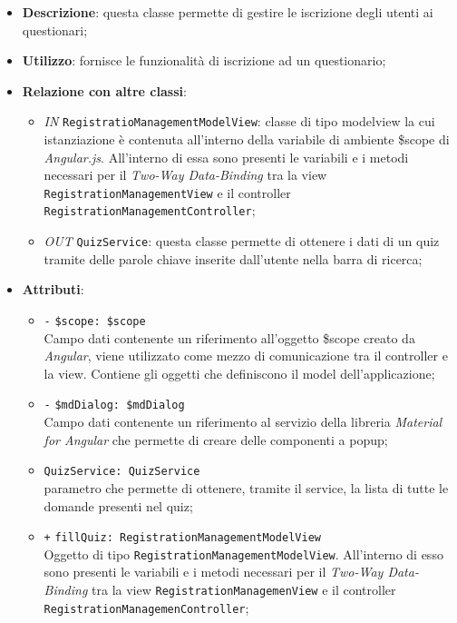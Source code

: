 \begin{itemize}
	\item \textbf{Descrizione}: questa classe permette di gestire le iscrizione degli utenti ai questionari;
	\item \textbf{Utilizzo}: fornisce le funzionalità di iscrizione ad un questionario;
	\item \textbf{Relazione con altre classi}:
	\begin{itemize}
		\item \textit{IN} \texttt{RegistratioManagementModelView}: classe di tipo modelview la cui istanziazione è contenuta all'interno della variabile di ambiente \$scope di \textit{Angular.js}. All'interno di essa sono presenti le variabili e i metodi necessari per il \textit{Two-Way Data-Binding} tra la view \texttt{RegistrationManagementView} e il controller \texttt{RegistrationManagementController}; 
		\item \textit{OUT} \texttt{QuizService}: questa classe permette di ottenere i dati di un quiz tramite delle parole chiave inserite dall'utente nella barra di ricerca;
	\end{itemize}
	\item \textbf{Attributi}:
	\begin{itemize}
		\item \texttt{-} \texttt{\$scope: \$scope} \\
		Campo dati contenente un riferimento all’oggetto \$scope creato da \textit{Angular}, viene utilizzato come mezzo di comunicazione tra il controller e la view. Contiene gli oggetti che definiscono il model dell’applicazione;
		\item \texttt{-} \texttt{\$mdDialog: \$mdDialog} \\
		Campo dati contenente un riferimento al servizio della libreria \textit{Material for Angular} che permette di creare delle componenti a popup;
		\item \texttt{QuizService: QuizService}\\ parametro che permette di ottenere, tramite il service, la lista di tutte le domande presenti nel quiz;
		\item \texttt{+} \texttt{fillQuiz: RegistrationManagementModelView} \\
		Oggetto di tipo \texttt{RegistrationManagementModelView}. All'interno di esso sono presenti le variabili e i metodi necessari per il \textit{Two-Way Data-Binding} tra la view \texttt{RegistrationManagemenView} e il controller \texttt{RegistrationManagemenController};

\end{itemize}
\end{itemize}

